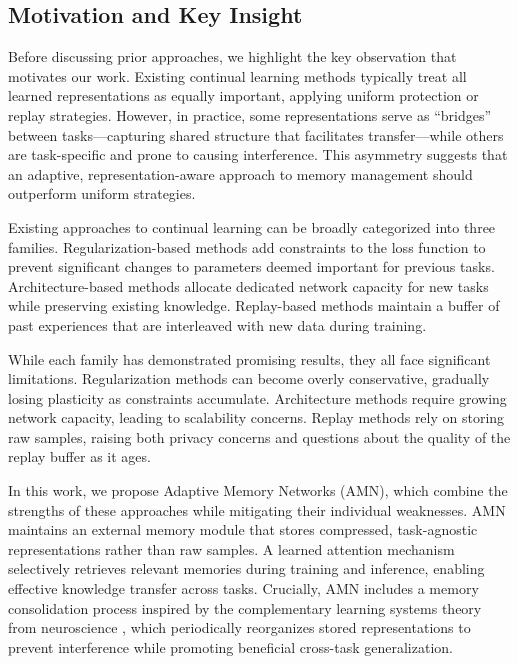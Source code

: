 \documentclass[11pt]{article}
\begin{document}
\subsection{Motivation and Key Insight}

Before discussing prior approaches, we highlight the key observation that motivates our work. Existing continual learning methods typically treat all learned representations as equally important, applying uniform protection or replay strategies. However, in practice, some representations serve as ``bridges'' between tasks---capturing shared structure that facilitates transfer---while others are task-specific and prone to causing interference. This asymmetry suggests that an adaptive, representation-aware approach to memory management should outperform uniform strategies.

Existing approaches to continual learning can be broadly categorized into three families. Regularization-based methods \citep{kirkpatrick2017overcoming, zenke2017continual, aljundi2018memory} add constraints to the loss function to prevent significant changes to parameters deemed important for previous tasks. Architecture-based methods \citep{rusu2016progressive, yoon2018lifelong, li2019learn} allocate dedicated network capacity for new tasks while preserving existing knowledge. Replay-based methods \citep{rebuffi2017icarl, shin2017continual, rolnick2019experience} maintain a buffer of past experiences that are interleaved with new data during training.

While each family has demonstrated promising results, they all face significant limitations. Regularization methods can become overly conservative, gradually losing plasticity as constraints accumulate. Architecture methods require growing network capacity, leading to scalability concerns. Replay methods rely on storing raw samples, raising both privacy concerns and questions about the quality of the replay buffer as it ages.

In this work, we propose Adaptive Memory Networks (AMN), which combine the strengths of these approaches while mitigating their individual weaknesses. AMN maintains an external memory module that stores compressed, task-agnostic representations rather than raw samples. A learned attention mechanism selectively retrieves relevant memories during training and inference, enabling effective knowledge transfer across tasks. Crucially, AMN includes a memory consolidation process inspired by the complementary learning systems theory from neuroscience \citep{mcclelland1995there, kumaran2016learning}, which periodically reorganizes stored representations to prevent interference while promoting beneficial cross-task generalization.
\end{document}
